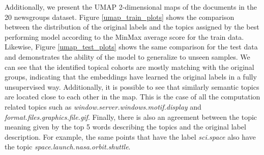 \documentclass[a4paper]{article}
\begin{document}
Additionally, we present the UMAP 2-dimensional maps of the documents in the 20 newsgroups dataset. Figure \ref{umap_train_plots} shows the comparison between the distribution of the original labels and the topics assigned by the best performing model according to the MinMax average score for the train data. Likewise, Figure \ref{umap_test_plots} shows the same comparison for the test data and demonstrates the ability of the model to generalize to unseen samples. We can see that the identified topical cohorts are mostly matching with the original groups, indicating that the embeddings have learned the original labels in a fully unsupervised way. Additionally, it is possible to see that similarly semantic topics are located close to each other in the map. This is the case of all the computation related topics such as \emph{window.server.windows.motif.display} and \emph{format.files.graphics.file.gif}. Finally, there is also an agreement between the topic meaning given by the top 5 words describing the topics and the original label description. For example, the same points that have the label \emph{sci.space} also have the topic \emph{space.launch.nasa.orbit.shuttle}.
\end{document}
